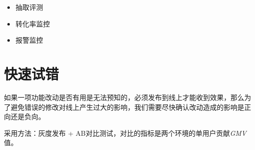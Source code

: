 \documentclass{report}
\begin{document}
\begin{CJK}{UTF8}{gbsn}
\begin{itemize}
  \item { 抽取评测 }
  \item { 转化率监控 }
  \item { 报警监控 }
\end{itemize}

\section{快速试错}

如果一项功能改动是否有用是无法预知的，必须发布到线上才能收到效果，那么为了避免错误的修改对线上产生过大的影响，我们需要尽快确认改动造成的影响是正向还是负向。

采用方法：灰度发布 + AB对比测试，对比的指标是两个环境的单用户贡献\emph{GMV}值。



\clearpage
\end{CJK}
\end{document}
